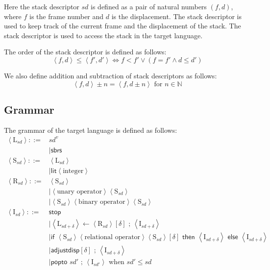 \documentclass[12pt,twoside,a4paper]{report}
\theoremstyle{definition}
\theoremstyle{definition}
\theoremstyle{definition}
\theoremstyle{definition}
\newcommand{\bracket}[1]{\left\langle #1 \right\rangle}
\begin{document}
    Here the stack descriptor $sd$ is defined as a pair of natural numbers $(f, d)$, where $f$ is the frame number and $d$ is the displacement. The stack descriptor is used to keep track of the current frame and the displacement of the stack. The stack descriptor is used to access the stack in the target language.

    The order of the stack descriptor is defined as follows:
    \[\bracket{f, d} \leq \bracket{f', d'} \Leftrightarrow f < f' \lor (f = f' \land d \leq d')\]

    We also define addition and subtraction of stack descriptors as follows:
    \[\bracket{f, d} \pm n = \bracket{f, d \pm n} \text{ for } n \in \mathbb{N}\]

    \subsection{Grammar}
    The grammar of the target language is defined as follows:
    \[\begin{aligned}
        \bracket{\text{L}_{sd}} ::={}& sd^v \\
                        &\mid \textsf{sbrs}  \\
        \bracket{\text{S}_{sd}} ::={}& \bracket{\text{L}_{sd}} \\
                        &\mid \textsf{lit} \bracket{\text{integer}} \\
        \bracket{\text{R}_{sd}} ::={}& \bracket{\text{S}_{sd}} \\
                        &\mid \bracket{ \text{unary operator} } \bracket{ \text{S}_{sd}}\\
                        &\mid \bracket{\text{S}_{sd}} \bracket{\text{binary operator}} \bracket{ \text{S}_{sd} } \\
        \bracket{\text{I}_{sd}} ::={}& \textsf{stop} \\
                        &\mid \bracket{\text{L}_{sd+\delta}} \gets \bracket{\text{R}_{sd}}[\delta] \text{ ; } \bracket{\text{I}_{sd+\delta}} \\
                        &\mid \textsf{if } \bracket{\text{S}_{sd}} \bracket{\text{relational operator}} \bracket{\text{S}_{sd}}[\delta] \textsf{ then } \bracket{\text{I}_{sd+\delta}} \textsf{ else } \bracket{\text{I}_{sd+\delta}} \\
                        &\mid \textsf{adjustdisp} [\delta] \text{ ; } \bracket{\text{I}_{sd+\delta}} \\
                        &\mid \textsf{popto } sd' \text{ ; } \bracket{\text{I}_{sd'}} \text{ when } sd' \leq sd \\
    \end{aligned}\]
\end{document}
